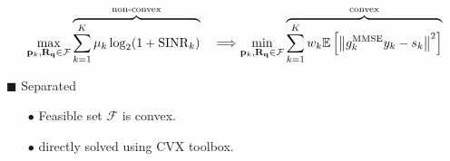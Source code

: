 \documentclass[paperwidth=841mm,paperheight=1300mm,portrait]{baposter}
\begin{document}
\begin{poster}
{\begin{itemize}
        \begin{equation}\notag
            \max_{{\bf p}_k, {\bf R_q} \in \mathcal{F}} \overbrace{\sum_{k=1}^K \mu_k \log_2(1+\mathrm{SINR}_k)}^{\text{non-convex}} \quad  \Longrightarrow \min_{{\bf p}_k, {\bf R_q} \in \mathcal{F}} \overbrace{\sum_{k=1}^K w_k \mathbb{E} \left[ \left\Vert g_k^{\mathrm{MMSE}}y_k - s_k \right\Vert^2 \right]}^{\text{convex}}
        \end{equation}
        \begin{minipage}[c]{\textwidth/3}
                $\blacksquare$ Separated
                \begin{itemize}
                    \vspace{-2pt}\item[$\bullet$] Feasible set $\mathcal{F}$ is convex.
                    \vspace{-2pt}\item[$\bullet$] directly solved using CVX toolbox.
                \end{itemize}   
  

\end{minipage}
\end{itemize}}
\end{poster}
\end{document}
